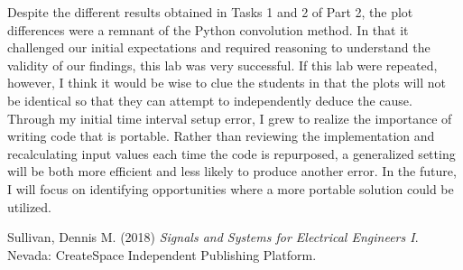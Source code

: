 \documentclass[12pt]{report}
\begin{document}
Despite the different results obtained in Tasks 1 and 2 of Part 2, the plot differences were a remnant of the Python convolution method. In that it challenged our initial expectations and required reasoning to understand the validity of our findings, this lab was very successful. If this lab were repeated, however, I think it would be wise to clue the students in that the plots will not be identical so that they can attempt to independently deduce the cause. \\

Through my initial time interval setup error, I grew to realize the importance of writing code that is portable. Rather than reviewing the implementation and recalculating input values each time the code is repurposed, a generalized setting will be both more efficient and less likely to produce another error. In the future, I will focus on identifying opportunities where a more portable solution could be utilized. \\
	
\newpage
\begin{thebibliography}{111}
		
Sullivan, Dennis M. (2018) {\it  Signals and Systems for Electrical Engineers I}. Nevada: CreateSpace Independent Publishing Platform.
		
\end{thebibliography}
\end{document}
